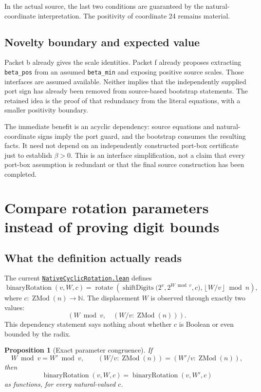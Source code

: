 \documentclass[11pt,letterpaper]{article}
\newcommand{\code}[1]{{\small\urlstyle{tt}\nolinkurl{#1}}}
\newcommand{\source}[2]{\href{https://github.com/VladimirReshetnikov/ProveIt/blob/f00ba53b331833c6cb64707bd90e48489e5610f5/#1}{#2}}
\newcommand{\module}[1]{\code{#1.lean}}
\newtheorem{proposition}{Proposition}[section]
\begin{document}
In the actual source, the last two conditions are guaranteed by the natural-coordinate interpretation. The positivity of coordinate 24 remains material.

\subsection{Novelty boundary and expected value}

Packet b already gives the scale identities. Packet f already proposes extracting \code{beta_pos} from an assumed \code{beta_min} and exposing positive source scales. Those interfaces are assumed available. Neither implies that the independently supplied port sign has already been removed from source-based bootstrap statements. The retained idea is the proof of that redundancy from the literal equations, with a smaller positivity boundary.

The immediate benefit is an acyclic dependency: source equations and natural-coordinate signs imply the port guard, and the bootstrap consumes the resulting facts. It need not depend on an independently constructed port-box certificate just to establish $\beta>0$. This is an interface simplification, not a claim that every port-box assumption is redundant or that the final source construction has been completed.

\section{Compare rotation parameters instead of proving digit bounds}
\label{sec:rotation}

\subsection{What the definition actually reads}

The current \source{Computability/DiophantineConsistency/Lean/DiophantineConsistency/NativeCyclicRotation.lean}{\module{NativeCyclicRotation}} defines
\[
 \operatorname{binaryRotation}(v,W,c)
 =\operatorname{rotate}\left(
   \operatorname{shiftDigits}\bigl(2^v,2^{W\bmod v},c\bigr),
   \left\lfloor W/v\right\rfloor\bmod n\right),
\]
where $c:\operatorname{ZMod}(n)\to\mathbb N$. The displacement $W$ is observed through exactly two values:
\[
 \left(W\bmod v,\quad (W/v:\operatorname{ZMod}(n))\right).
\]
This dependency statement says nothing about whether $c$ is Boolean or even bounded by the radix.

\begin{proposition}[Exact parameter congruence]
If
\[
 W\bmod v=W'\bmod v,\qquad
 (W/v:\operatorname{ZMod}(n))=(W'/v:\operatorname{ZMod}(n)),
\]
then
\[
 \operatorname{binaryRotation}(v,W,c)=\operatorname{binaryRotation}(v,W',c)
\]
as functions, for every natural-valued $c$.
\end{proposition}
\end{document}
